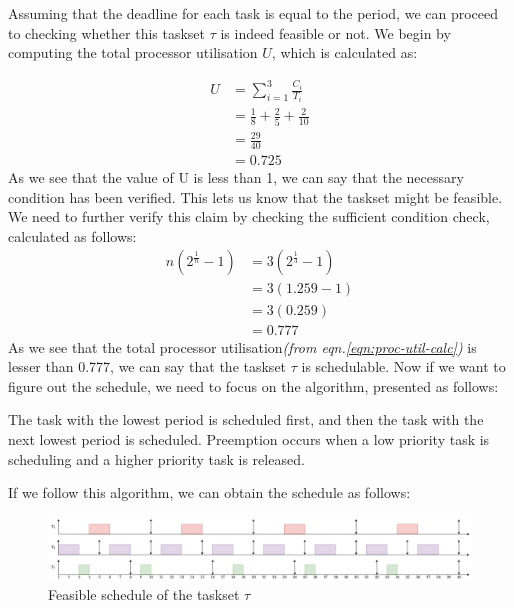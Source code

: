 Assuming that the deadline for each task is equal to the period, we can proceed to checking whether this taskset $\tau$ is indeed feasible or not. We begin by computing the total processor utilisation $U$, which is calculated as:

\begin{equation} \label{eqn:proc-util-calc}
\begin{split}
U & = \sum_{i=1}^{3}\frac{C_{i}}{T_{i}} \\
  & = \frac{1}{8} + \frac{2}{5} + \frac{2}{10} \\
  & = \frac{29}{40} \\
  & = 0.725
\end{split}
\end{equation}
As we see that the value of U is less than 1, we can say that the necessary condition has been verified. This lets us know that the taskset might be feasible. We need to further verify this claim by checking the sufficient condition check, calculated as follows:
\begin{equation} \label{eqn:suf-test-calc}
\begin{split}
n({2}^{\frac{1}{n}} - 1) & = 3({2}^{\frac{1}{3}} - 1) \\
                         & = 3(1.259 - 1) \\
                         & = 3(0.259) \\
                         & = 0.777
\end{split}
\end{equation}
As we see that the total processor utilisation\textit{(from eqn.\ref{eqn:proc-util-calc})} is lesser than 0.777, we can say that the taskset $\tau$ is schedulable. Now if we want to figure out the schedule, we need to focus on the algorithm, presented as follows:\\

\begin{tcolorbox}[title=Rate-Monotonic Scheduling Algorithm]
  The task with the lowest period is scheduled first, and then the task with the next lowest period is scheduled. Preemption occurs
  when a low priority task is scheduling and a higher priority task is released.
\end{tcolorbox}
\vspace{5mm}
If we follow this algorithm, we can obtain the schedule as follows:
\begin{figure}[!ht]
  \centering
  \includegraphics[width=\textwidth]{../imgs/sched-analysis}
  \caption{Feasible schedule of the taskset $\tau$}
\end{figure}

